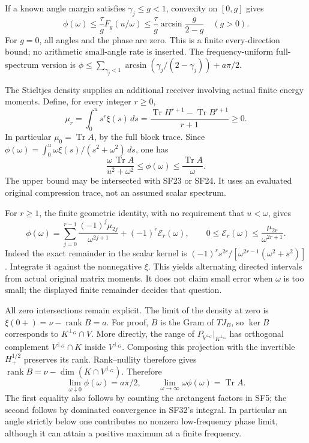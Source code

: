 \documentclass[10pt]{article}
\begin{document}
If a known angle margin satisfies \(\gamma_j\le g<1\), convexity on \([0,g]\) gives \[
 \phi(\omega)\le\frac{\tau}{g}F_g(u/\omega)
 \le\frac{\tau}{g}\arcsin\frac{g}{2-g}\quad(g>0).
 \tag{SF30}
\] For \(g=0\), all angles and the phase are zero. This is a finite every-direction bound; no arithmetic small-angle rate is inserted. The frequency-uniform full-spectrum version is \(\phi\le\sum_{\gamma_j<1}\arcsin(\gamma_j/(2-\gamma_j))+a\pi/2\).

The Stieltjes density supplies an additional receiver involving actual finite energy moments. Define, for every integer \(r\ge0\), \[
 \mu_r=\int_0^u s^r\xi(s)\,ds
 =\frac{\operatorname{Tr}H^{r+1}-\operatorname{Tr}B^{r+1}}{r+1}\ge0 .
 \tag{SF31}
\] In particular \(\mu_0=\operatorname{Tr}A\), by the full block trace. Since \(\phi(\omega)=\int_0^u\omega\xi(s)/(s^2+\omega^2)\,ds\), one has \[
 \frac{\omega\,\operatorname{Tr}A}{u^2+\omega^2}
 \le\phi(\omega)\le\frac{\operatorname{Tr}A}{\omega}.
 \tag{SF32}
\] The upper bound may be intersected with SF23 or SF24. It uses an evaluated original compression trace, not an assumed scalar spectrum.

For \(r\ge1\), the finite geometric identity, with no requirement that \(u<\omega\), gives \[
 \phi(\omega)=\sum_{j=0}^{r-1}
   \frac{(-1)^j\mu_{2j}}{\omega^{2j+1}}
   +(-1)^r\mathcal E_r(\omega),\qquad
 0\le\mathcal E_r(\omega)\le\frac{\mu_{2r}}{\omega^{2r+1}} .
 \tag{SF33}
\] Indeed the exact remainder in the scalar kernel is \((-1)^rs^{2r}/[\omega^{2r-1}(\omega^2+s^2)]\). Integrate it against the nonnegative \(\xi\). This yields alternating directed intervals from actual original matrix moments. It does not claim small error when \(\omega\) is too small; the displayed finite remainder decides that question.

All zero intersections remain explicit. The limit of the density at zero is \(\xi(0+)=\nu-\operatorname{rank}B=a\). For proof, \(B\) is the Gram of \(TJ_B\), so \(\ker B\) corresponds to \(K^{\perp_G}\cap V\). More directly, the range of \(P_{V^{\perp_G}}|_{K^{\perp_G}}\) has orthogonal complement \(V^{\perp_G}\cap K\) inside \(V^{\perp_G}\). Composing this projection with the invertible \(H_+^{1/2}\) preserves its rank. Rank--nullity therefore gives \(\operatorname{rank}B=\nu-\dim(K\cap V^{\perp_G})\). Therefore \[
 \lim_{\omega\downarrow0}\phi(\omega)=a\pi/2,\qquad
 \lim_{\omega\to\infty}\omega\phi(\omega)=\operatorname{Tr}A .
 \tag{SF34}
\] The first equality also follows by counting the arctangent factors in SF5; the second follows by dominated convergence in SF32's integral. In particular an angle strictly below one contributes no nonzero low-frequency phase limit, although it can attain a positive maximum at a finite frequency.
\end{document}
